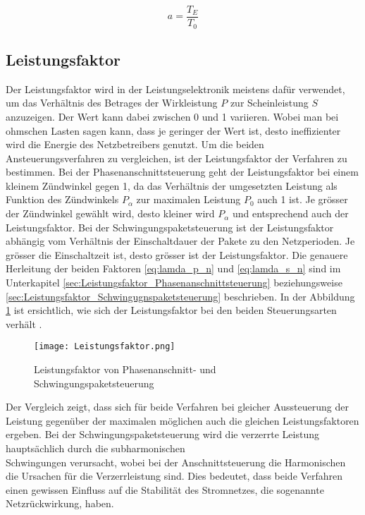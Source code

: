 \begin{equation}\label{eq:Einschaltverhältnis}
a = \frac{T_E}{T_0}
\end{equation}
\newpage
\subsection{Leistungsfaktor}\label{sec:Leistungsfaktor}
Der Leistungsfaktor wird in der Leistungselektronik meistens dafür verwendet, um das Verhältnis des Betrages der Wirkleistung $P$ zur Scheinleistung $S$ anzuzeigen. Der Wert kann dabei zwischen 0 und 1 variieren. Wobei man bei ohmschen Lasten sagen kann, dass je geringer der Wert ist, desto ineffizienter wird die Energie des Netzbetreibers genutzt. Um die beiden Ansteuerungsverfahren zu vergleichen, ist der Leistungsfaktor der Verfahren zu bestimmen. Bei der Phasenanschnittsteuerung geht der Leistungsfaktor bei einem kleinem Zündwinkel gegen 1, da das Verhältnis der umgesetzten Leistung als Funktion des Zündwinkels $P_{\alpha}$ zur maximalen Leistung $P_0$ auch 1 ist. Je grösser der Zündwinkel gewählt wird, desto kleiner wird $P_{\alpha}$ und entsprechend auch der Leistungsfaktor. Bei der Schwingungspaketsteuerung ist der Leistungsfaktor abhängig vom Verhältnis der Einschaltdauer der Pakete zu den Netzperioden. Je grösser die Einschaltzeit ist, desto grösser ist der Leistungsfaktor. Die genauere Herleitung der beiden Faktoren \ref{eq:lamda_p_n} und \ref{eq:lamda_s_n} sind im Unterkapitel \ref{sec:Leistungsfaktor_Phasenanschnittsteuerung} beziehungsweise \ref{sec:Leistungsfaktor_Schwingugnspaketsteuerung} beschrieben. In der Abbildung \ref{fig:Leistungsfaktor} ist ersichtlich, wie sich der Leistungsfaktor bei den beiden Steuerungsarten verhält \cite{Leistungselektronik}.

\begin{figure}[ht!]
	\centering
	\texttt{[image: Leistungsfaktor.png]}	
	\caption{Leistungsfaktor von Phasenanschnitt- und Schwingungspaketsteuerung}\label{fig:Leistungsfaktor}
\end{figure}

Der Vergleich zeigt, dass sich für beide Verfahren bei gleicher Aussteuerung der Leistung gegenüber der maximalen möglichen auch die gleichen Leistungsfaktoren ergeben. Bei der Schwingungspaketsteuerung wird die verzerrte Leistung hauptsächlich durch die subharmonischen \\ Schwingungen verursacht, wobei bei der Anschnittsteuerung die Harmonischen die Ursachen für die Verzerrleistung sind. Dies bedeutet, dass beide Verfahren einen gewissen Einfluss auf die Stabilität des Stromnetzes, die sogenannte Netzrückwirkung, haben.
\newpage
